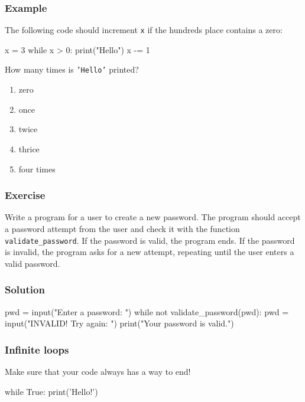 \documentclass[11pt]{beamer}
\begin{document}
\begin{frame}[fragile]
  \frametitle{Example}
  \Enlarge

  The following code should increment \texttt{x} if the hundreds place contains a zero:
  \begin{semiverbatim}
x = 3
while x > 0:
    print("Hello")
x -= 1
  \end{semiverbatim}
  How many times is \texttt{'Hello'} printed?
  \begin{enumerate}[label=\Alph*]
  \item  zero
  \item  once
  \item  twice
  \item  thrice
  \item  four times
  \end{enumerate}
\end{frame}

\begin{frame}[fragile]
  \frametitle{Exercise}
  \Enlarge

  Write a program for a user to create a new password.  The program should accept a password attempt from the user and check it with the function \texttt{validate\_password}.  If the password is valid, the program ends.  If the password is invalid, the program asks for a new attempt, repeating until the user enters a valid password.
\end{frame}

\begin{frame}[fragile]
  \frametitle{Solution}
  \Enlarge

  \begin{semiverbatim}
pwd = input("Enter a password:  ")
while not validate_password(pwd):
    pwd = input("INVALID!  Try again:  ")
print("Your password is valid.")
  \end{semiverbatim}
\end{frame}

\begin{frame}[fragile]
  \frametitle{Infinite loops}
  \Enlarge

  \begin{itemize}
  \myitem  Make sure that your code always has a way to end! \pause
  \begin{semiverbatim}
while True:
    print('Hello!')
  \end{semiverbatim}
  \end{itemize}
\end{frame}
\end{document}
